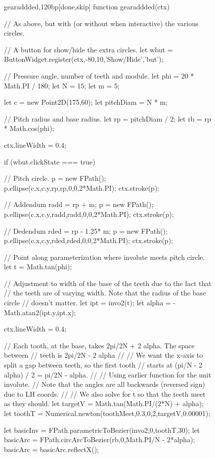 \documentclass[10pt]{article}
\begin{document}
\begin{figure}[b!]
\begin{figput}{gearaddded,120bp}[done,skip]
function gearaddded(ctx) {

  // As above, but with (or without when interactive) the various circles.
  
  // A button for show/hide the extra circles.
  let wbut = ButtonWidget.register(ctx,-80,10,'Show/Hide','but');
  
  // Pressure angle, number of teeth and module.
  let phi = 20 * Math.PI / 180;
  let N = 15;
  let m = 5;

  let c = new Point2D(175,60);
  let pitchDiam = N * m;

  // Pitch radius and base radius.
  let rp = pitchDiam / 2;
  let rb = rp * Math.cos(phi);

  ctx.lineWidth = 0.4;

  if (wbut.clickState === true)
    {
      // Pitch circle.
      p = new FPath();
      p.ellipse(c.x,c.y,rp,rp,0,0,2*Math.PI);
      ctx.stroke(p);

      // Addendum
      radd = rp + m;
      p = new FPath();
      p.ellipse(c.x,c.y,radd,radd,0,0,2*Math.PI);
      ctx.stroke(p);

      // Dedendum
      rded = rp - 1.25* m;
      p = new FPath();
      p.ellipse(c.x,c.y,rded,rded,0,0,2*Math.PI);
      ctx.stroke(p);
    }


  // Point along parameterization where involute meets pitch circle.
  let t = Math.tan(phi);

  // Adjustment to width of the base of the teeth due to the fact that
  // the teeth are of varying width. Note that the radius of the base circle
  // doesn't matter.
  let ipt = invo2(t);
  let alpha = -Math.atan2(ipt.y,ipt.x);

  ctx.lineWidth = 0.4;

  // Each tooth, at the base, takes 2pi/2N + 2 alpha. The space between
  // teeth is 2pi/2N - 2 alpha
  //
  // We want the x-axis to split a gap between teeth, so the first tooth
  // starts at (pi/N - 2 alpha) / 2 = pi/2N - alpha.
  //
  // Using earlier function for the unit involute.
  // Note that the angles are all backwards (reversed sign) due to LH coords.
  //
  // We also solve for t so that the teeth meet as they should.
  let targetV = Math.tan(Math.PI/(2*N) + alpha);
  let toothT = Numerical.newton(toothMeet,0.3,0,2,targetV,0.00001);
  
  let basicInv = FPath.parametricToBezier(invo2,0,toothT,30);
  let basicArc = FPath.circArcToBezier(rb,0,Math.PI/N - 2*alpha);
  basicArc = basicArc.reflectX();

}
\end{figput}
\end{figure}
\end{document}
